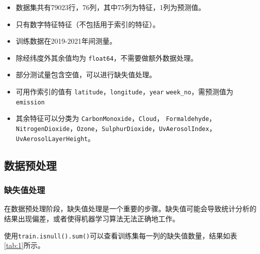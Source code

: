 \documentclass{ctexart}
\begin{document}
\begin{itemize}
      \item 数据集共有79023行，76列，其中75列为特征，1列为预测值。
      \item 只有数字特征特征（不包括用于索引的特征）。
      \item 训练数据在2019-2021年间测量。
      \item 除经纬度外其余值均为 \texttt{float64}，不需要做额外数据处理。
      \item 部分测试量包含空值，可以进行缺失值处理。
      \item 可用作索引的值有 \texttt{latitude}，\texttt{longitude}，\texttt{year} \texttt{week\_no}，需预测值为 \texttt{emission}
      \item 其余特征可以分类为 \texttt{CarbonMonoxide}，\texttt{Cloud}， \texttt{Formaldehyde}，\texttt{NitrogenDioxide}，\texttt{Ozone}，\texttt{SulphurDioxide}，\texttt{UvAerosolIndex}，\texttt{UvAerosolLayerHeight}。
\end{itemize}

\subsection{数据预处理}

\subsubsection{缺失值处理}

在数据预处理阶段，缺失值处理是一个重要的步骤。缺失值可能会导致统计分析的结果出现偏差，或者使得机器学习算法无法正确地工作。

使用\verb|train.isnull().sum()|可以查看训练集每一列的缺失值数量，结果如表\ref{tab:1}所示。
\end{document}
